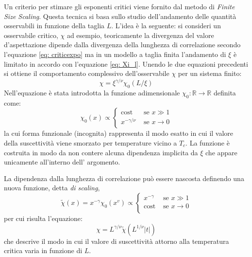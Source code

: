 Un criterio per stimare gli esponenti critici viene fornito dal metodo di \emph{Finite Size Scaling}.
Questa tecnica si basa sullo studio dell'andamento delle quantità osservabili in funzione della taglia $L$.
L'idea è la seguente: si consideri un osservabile critico, $\chi$ ad esempio, teoricamente la divergenza del valore d'aspettazione dipende dalla divergenza della lunghezza di correlazione secondo l'equazione \ref{eq: criticexpo} ma in un modello a taglia finita l'andamento di $\xi$ è limitato in accordo con l'equazione \ref{eq: Xi_l}. 
Unendo le due equazioni precedenti si ottiene il comportamento complessivo dell'osservabile $\chi$ per un sistema finito:
\begin{equation}\label{eq: Chi_finite}
\chi = \xi^{\gamma /\nu} \chi_0 (L/\xi)
\end{equation}
Nell'equazione è stata introdotta la funzione adimensionale $\chi_0:\mathbb{R} \rightarrow \mathbb{R}$ definita come:
\begin{equation}
\chi_0 (x) \propto \left\{ \begin{array}{rl}
		\mbox{cost}  &\mbox{ se $x \gg 1$} \\
  x^{-\gamma/\nu} &\mbox{ se $x \rightarrow 0$} \\
       \end{array} \right.
\end{equation}
la cui forma funzionale (incognita) rappresenta il modo esatto in cui il valore della suscettività viene smorzato per temperature vicino a $T_c$. 
La funzione è costruita in modo da non contere alcuna dipendenza implicita da $\xi$ che appare unicamente all'interno dell' argomento.

La dipendenza dalla lunghezza di correlazione può essere nascosta definendo una nuova funzione, detta \emph{di scaling},
\begin{equation}
\tilde{\chi}(x) = x^{-\gamma}\chi_0(x^{v}) \propto \left\{ \begin{array}{rl}
		x^{-\gamma}  &\mbox{ se $x \gg 1$} \\
  \mbox{cost} &\mbox{ se $x \rightarrow 0$} \\
       \end{array} \right.
\end{equation}
per cui risulta l'equazione:
\begin{equation}
\chi = L^{\gamma / \nu} \tilde{\chi}(L^{1/\nu} |t|)
\end{equation}
che descrive il modo in cui il valore di suscettività attorno alla temperatura critica varia in funzione di $L$.

